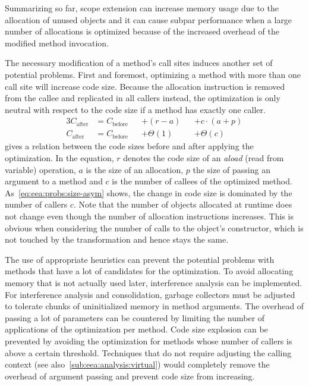 		Summarizing so far, scope extension can increase memory usage due to the allocation of unused objects and it can
		cause subpar performance when a large number of allocations is optimized because of the increased overhead of the
		modified method invocation.

		The necessary modification of a method's call sites induces another set of potential problems. First and foremost,
		optimizing a method with more than one call site will increase code size. Because the allocation instruction is
		removed from the callee and replicated in all callers instead, the optimization is only neutral with respect to the
		code size if a method has exactly one caller.
		\begin{alignat}{3}
			C_\text{after}
				&= C_\text{before} &&+ (r - a)   &&+ c \cdot (a + p) \label{eq:eea:probs:size}\\
			C_\text{after}
				&= C_\text{before} &&+ \Theta(1) &&+ \Theta(c) \label{eq:eea:probs:size-asym}
		\end{alignat}
		 gives a relation between the code sizes before and after applying the optimization. In the
		equation, $r$ denotes the code size of an \emph{aload} (read from variable) operation, $a$ is the size of an
		allocation, $p$ the size of passing an argument to a method and $c$ is the number of callees of the optimized
		method. As~\cref{eq:eea:probs:size-asym} shows, the change in code size is dominated by the number of callers $c$.
		Note that the number of objects allocated at runtime does not change even though the number of allocation
		instructions increases. This is obvious when considering the number of calls to the object's constructor, which is
		not touched by the transformation and hence stays the same.

		The use of appropriate heuristics can prevent the potential problems with methods that have a lot of candidates for
		the optimization. To avoid allocating memory that is not actually used later, interference analysis can be
		implemented. For interference analysis and consolidation, garbage collectors must be adjusted to tolerate chunks of
		uninitialized memory in method arguments. The overhead of passing a lot of parameters can be countered by limiting
		the number of applications of the optimization per method. Code size explosion can be prevented by avoiding the
		optimization for methods whose number of callers is above a certain threshold. Techniques that do not require
		adjusting the calling context (see also~\cref{sub:eea:analysis:virtual}) would completely remove the overhead of
		argument passing and prevent code size from increasing.

